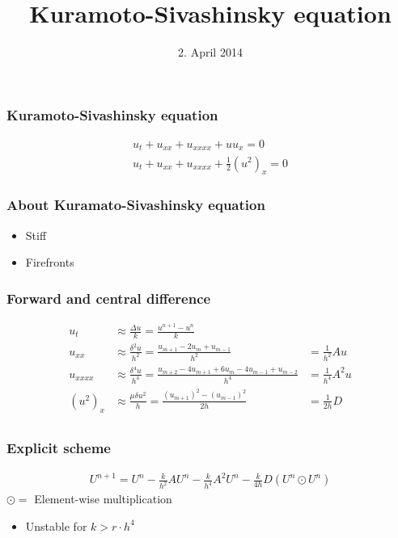 \documentclass[screen]{beamer}
\title[Kuramoto-Sivashinsky]%
{Kuramoto-Sivashinsky equation}
\date{2. April 2014}
\begin{document}
\begin{frame}
\titlepage
\end{frame}

\begin{frame}
\frametitle{Kuramoto-Sivashinsky equation}
\Large
\begin{align*}
u_t + u_{xx} + u_{xxxx} + uu_x = 0 \\
u_t + u_{xx} + u_{xxxx} + \frac{1}{2}(u^2)_x = 0
\end{align*}
\end{frame}


\begin{frame}
\frametitle{About Kuramato-Sivashinsky equation}
\begin{itemize}
\item Stiff
\item Firefronts
\end{itemize}

\end{frame}


\begin{frame}
\frametitle{Forward and central difference}
\begin{align*}
u_t &\approx \frac{\Delta u}{k} = \frac{u^{n+1}-u^n}{k} \\
u_{xx} &\approx \frac{\delta^2 u}{h^2} = \frac{u_{m+1}-2u_{m}+u_{m-1}}{h^2} &= \frac{1}{h^2}Au \\
u_{xxxx} &\approx \frac{\delta^4 u}{h^4} = \frac{u_{m+2}-4u_{m+1}+6u_m-4u_{m-1}+u_{m-2}}{h^4} &= \frac{1}{h^4}A^2u\\
(u^2)_{x} &\approx \frac{\mu \delta u^2}{h} = \frac{(u_{m+1})^2-(u_{m-1})^2}{2h} &= \frac{1}{2h}D\\
\end{align*}
\end{frame}


\begin{frame}
\frametitle{Explicit scheme}
\flushright

\begin{align*}
U^{n+1} = U^n - \frac{k}{h^2}AU^n - \frac{k}{h^4}A^2U^n - \frac{k}{4h}D(U^{n}\odot U^n)
\end{align*}
$\odot =$ Element-wise multiplication
\begin{itemize}
\item Unstable for $k > r \cdot h^4$

\end{itemize}
\end{frame}
\end{document}
